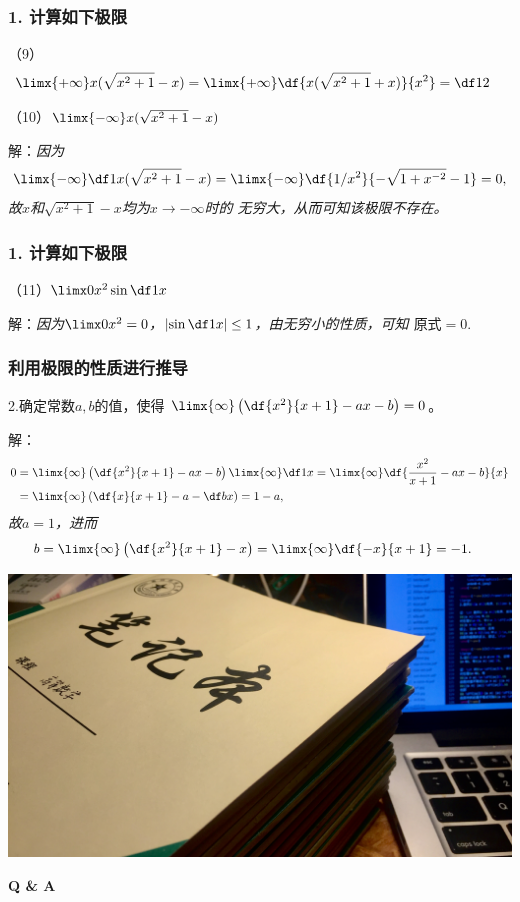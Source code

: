 \begin{frame}[t]\frametitle{1. 计算如下极限}
\large
（9）
\begin{align*}
	\limx{+\infty}&x(\sqrt{x^2+1}-x)
	=\limx{+\infty}\df{x(\sqrt{x^2+1}+x)}{x^2}=\df12
\end{align*}

\bs
（10）$\limx{-\infty}x(\sqrt{x^2+1}-x)$

解：{\it 因为
$$\limx{-\infty}\df1{x(\sqrt{x^2+1}-x)}
=\limx{-\infty}\df{1/x^2}{-\sqrt{1+x^{-2}}-1}=0,$$
故$x$和$\sqrt{x^2+1}-x$均为$x\to-\infty$时的
无穷大，从而可知该极限不存在。}
\end{frame}

\begin{frame}[t]\frametitle{1. 计算如下极限}
\large
（11）$\limx0x^2\sin\df1x$

解：{\it 因为$\limx0x^2=0$，$\left|\sin\df1x\right|\leq1$，由无穷小的性质，可知
$\mbox{原式}=0.$}
\end{frame}

\begin{frame}[t]\frametitle{利用极限的性质进行推导}
\large
2.确定常数$a,b$的值，使得
$\limx{\infty}\left(\df{x^2}{x+1}-ax-b\right)=0$。

解：\it
\begin{align*}
	0&=\limx{\infty}\left(\df{x^2}{x+1}-ax-b\right)\limx{\infty}\df1x
	=\limx{\infty}\df{\frac{x^2}{x+1}-ax-b}{x}\\
	&=\limx{\infty}\left(\df{x}{x+1}-a-\df bx\right)
	=1-a,
\end{align*}
故$a=1$，进而
\begin{align*}
	b&=\limx{\infty}\left(\df{x^2}{x+1}-x\right)
	=\limx{\infty}\df{-x}{x+1}=-1.
\end{align*}
\fin
\end{frame}

\begin{frame}
	\centering
	\includegraphics[width=\textwidth]{./images/ch01/HWR/notebook.jpg}

	\begin{flushright}
		\color{white}\vspace*{-2cm}
		\Huge\bf Q \& A
	\end{flushright}
\end{frame}